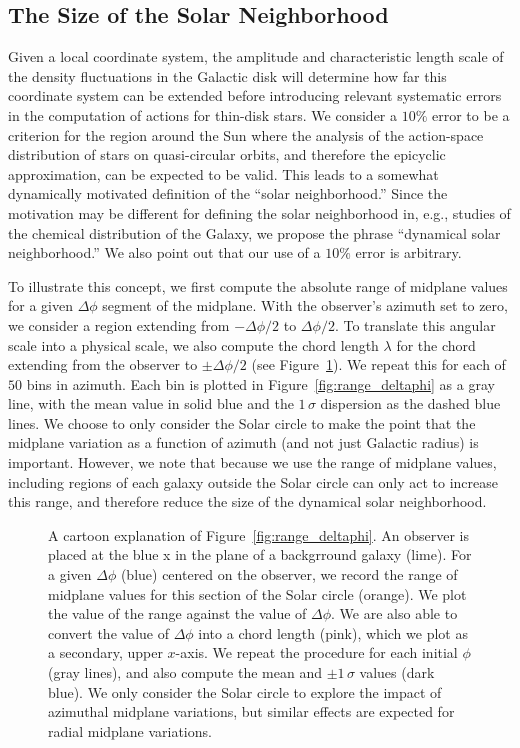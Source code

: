 \documentclass[twocolumn]{aastex62}
\begin{document}
\subsection{The Size of the Solar Neighborhood} \label{sssec:neighborhood}
Given a local coordinate system, the amplitude and characteristic length scale
of the density fluctuations in the Galactic disk will determine how far this
coordinate system can be extended before introducing relevant systematic
errors in the computation of actions for thin-disk stars. We consider a $10\%$
error to be a criterion for the region around the Sun where the analysis of
the action-space distribution of stars on quasi-circular orbits, and therefore
the epicyclic approximation, can be expected to be valid. This leads to a
somewhat dynamically motivated definition of the ``solar neighborhood.'' Since
the motivation may be different for defining the solar neighborhood in, e.g.,
studies of the chemical distribution of the Galaxy, we propose the phrase
``dynamical solar neighborhood.'' We also point out that our use of a $10\%$
error is arbitrary.

To illustrate this concept, we first compute the absolute range of midplane
values for a given $\Delta \phi$ segment of the midplane. With the observer's
azimuth set to zero, we consider a region extending from $-\Delta \phi/2$ to
$\Delta\phi/2$. To translate this angular scale into a physical scale, we also
compute the chord length $\lambda$ for the chord extending from the observer
to $\pm \Delta\phi/2$ (see Figure~\ref{fig:fig_to_explain}). We repeat this
for each of $50$ bins in azimuth. Each bin is plotted in
Figure~\ref{fig:range_deltaphi} as a gray line, with the mean value in solid
blue and the $1\,\sigma$ dispersion as the dashed blue lines. We choose to
only consider the Solar circle to make the point that the midplane variation
as a function of azimuth (and not just Galactic radius) is important. However,
we note that because we use the range of midplane values, including regions of
each galaxy outside the Solar circle can only act to increase this range, and
therefore reduce the size of the dynamical solar neighborhood.

\begin{figure}
\caption{A cartoon explanation of Figure~\ref{fig:range_deltaphi}. An observer
is placed at the blue x in the plane of a backgrround galaxy (lime). For a
given $\Delta \phi$ (blue) centered on the observer, we record the range of
midplane values for this section of the Solar circle (orange). We plot the
value of the range against the value of $\Delta \phi$. We are also able to
convert the value of $\Delta \phi$ into a chord length (pink), which we plot
as a secondary, upper $x$-axis. We repeat the procedure for each initial
$\phi$ (gray lines), and also compute the mean and $\pm1\,\sigma$ values (dark
blue). We only consider the Solar circle to explore the impact of azimuthal
midplane variations, but similar effects are expected for radial midplane
variations.}
\label{fig:fig_to_explain}
\end{figure}
\end{document}
